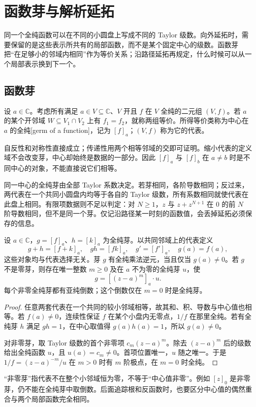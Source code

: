 \section{函数芽与解析延拓}
\label{b3:sec:0902}

同一个全纯函数可以在不同的小圆盘上写成不同的 Taylor 级数。向外延拓时，需要保留的是这些表示所共有的局部函数，而不是某个固定中心的级数。函数芽把“在足够小的邻域内相同”作为等价关系；沿路径延拓再规定，什么时候可以从一个局部表示换到下一个。

\subsection{函数芽}
\label{b3:subsec:090201}

\begin{definition}\label{b3:def:09-germ}
设 \(a\in\mathbb C\)。考虑所有满足 \(a\in V\subseteq\mathbb C\)、\(V\) 开且 \(f\) 在 \(V\) 全纯的二元组 \((V,f)\)。若 \(a\) 的某个开邻域 \(W\subseteq V_1\cap V_2\) 上有 \(f_1=f_2\)，就称两组等价。所得等价类称为中心在 \(a\) 的全纯[germ of a function]，记为 \([f]_a\)；\((V,f)\) 称为它的代表。
\end{definition}
自反性和对称性直接成立；传递性用两个相等邻域的交即可证明。缩小代表的定义域不会改变芽，中心却始终是数据的一部分。因此 \([f]_a\) 与 \([f]_b\) 在 \(a\ne b\) 时是不同中心的对象，不能直接说它们相等。

\ProseParagraphBreak
同一中心的全纯芽由全部 Taylor 系数决定。若芽相同，各阶导数相同；反过来，两代表在一个共同小圆盘内均等于各自的 Taylor 级数，所有系数相同就使代表在此盘上相同。有限项数据则不足以判定：对 \(N\ge1\)，\(z\) 与 \(z+z^{N+1}\) 在 \(0\) 的前 \(N\) 阶导数相同，但不是同一个芽。仅记沿路径某一时刻的函数值，会丢掉延拓必须保存的信息。

\begin{proposition}\label{b3:prop:09-germ-operations}
设 \(a\in\mathbb C\)，\(g=[f]_a\)、\(h=[k]_a\) 为全纯芽。以共同邻域上的代表定义
\[
 g+h=[f+k]_a,\quad gh=[fk]_a,\quad g'=[f']_a,\quad g(a)=f(a),
\]
这些对象均与代表选择无关。芽 \(g\) 有全纯乘法逆元，当且仅当 \(g(a)\ne0\)。若 \(g\) 不是零芽，则存在唯一整数 \(m\ge0\) 及在 \(a\) 不为零的全纯芽 \(u\)，使
\[
 g=[(z-a)^m]_a\cdot u.
\]
每个非零全纯芽都有亚纯倒数；这个倒数仅在 \(m=0\) 时是全纯芽。
\end{proposition}
\begin{proof}
任意两套代表在一个共同的较小邻域相等，故其和、积、导数与中心值也相等。若 \(f(a)\ne0\)，连续性保证 \(f\) 在某个小盘内无零点，\(1/f\) 在那里全纯。若有全纯芽 \(h\) 满足 \(gh=1\)，在中心取值得 \(g(a)h(a)=1\)，所以 \(g(a)\ne0\)。

对非零芽，取 Taylor 级数的首个非零项 \(c_m(z-a)^m\)。除去 \((z-a)^m\) 后的级数给出全纯函数 \(u\)，且 \(u(a)=c_m\ne0\)。首项位置唯一，\(u\) 随之唯一。于是 \(1/f=(z-a)^{-m}/u\) 在 \(m>0\) 时有 \(m\) 阶极点，在 \(m=0\) 时全纯。
\end{proof}
“非零芽”指代表不在整个小邻域恒为零，不等于“中心值非零”。例如 \([z]_0\) 是非零芽，仍不能在全纯芽中取倒数。后面追踪根和反函数时，也要区分中心值的偶然重合与两个局部函数完全相同。

